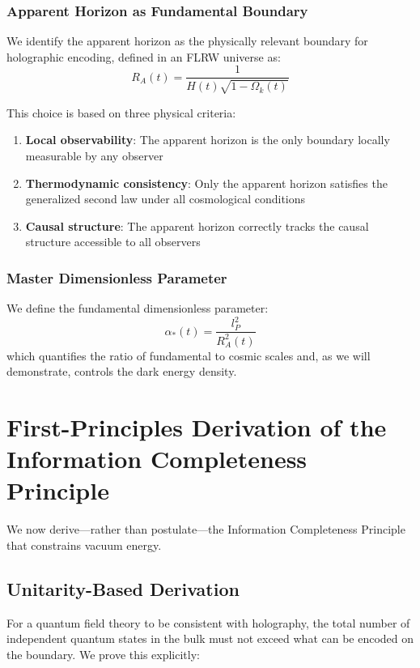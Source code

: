 \documentclass[12pt]{article}
\theoremstyle{plain}
\theoremstyle{definition}
\theoremstyle{remark}
\begin{document}
\subsubsection{Apparent Horizon as Fundamental Boundary}

We identify the apparent horizon as the physically relevant boundary for holographic encoding, defined in an FLRW universe as:
\begin{equation}
R_A(t) = \frac{1}{H(t)\sqrt{1-\Omega_k(t)}}
\end{equation}

This choice is based on three physical criteria:
\begin{enumerate}
\item \textbf{Local observability}: The apparent horizon is the only boundary locally measurable by any observer
\item \textbf{Thermodynamic consistency}: Only the apparent horizon satisfies the generalized second law under all cosmological conditions
\item \textbf{Causal structure}: The apparent horizon correctly tracks the causal structure accessible to all observers
\end{enumerate}

\subsubsection{Master Dimensionless Parameter}

We define the fundamental dimensionless parameter:
\[
\alpha_*(t) = \frac{l_P^2}{R_A^2(t)}
\]
which quantifies the ratio of fundamental to cosmic scales and, as we will demonstrate, controls the dark energy density.

\section{First-Principles Derivation of the Information Completeness Principle}

We now derive—rather than postulate—the Information Completeness Principle that constrains vacuum energy.

\subsection{Unitarity-Based Derivation}

For a quantum field theory to be consistent with holography, the total number of independent quantum states in the bulk must not exceed what can be encoded on the boundary. We prove this explicitly:
\end{document}
